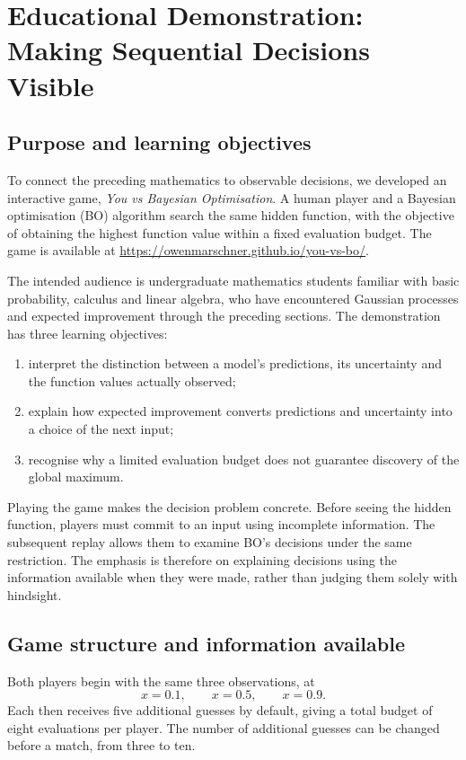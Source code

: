 \section{Educational Demonstration: Making Sequential Decisions Visible}
\label{sec:educational-demo}

\subsection{Purpose and learning objectives}

To connect the preceding mathematics to observable decisions, we developed
an interactive game, \emph{You vs Bayesian Optimisation}. A human player
and a Bayesian optimisation (BO) algorithm search the same hidden
function, with the objective of obtaining the highest function value
within a fixed evaluation budget. The game is available at
\url{https://owenmarschner.github.io/you-vs-bo/}.

The intended audience is undergraduate mathematics students familiar with
basic probability, calculus and linear algebra, who have encountered
Gaussian processes and expected improvement through the preceding
sections. The demonstration has three learning objectives:
\begin{enumerate}
    \item interpret the distinction between a model's predictions,
    its uncertainty and the function values actually observed;
    \item explain how expected improvement converts predictions and
    uncertainty into a choice of the next input;
    \item recognise why a limited evaluation budget does not guarantee
    discovery of the global maximum.
\end{enumerate}

Playing the game makes the decision problem concrete. Before seeing
the hidden function, players must commit to an input using incomplete
information. The subsequent replay allows them to examine
BO's decisions under the same restriction. The emphasis is therefore on
explaining decisions using the information available when they were made,
rather than judging them solely with hindsight.


\subsection{Game structure and information available}
\label{subsec:demo-rules}

Both players begin with the same three observations, at
\[
    x=0.1,\qquad x=0.5,\qquad x=0.9.
\]
Each then receives five additional guesses by default, giving a total
budget of eight evaluations per player. The number of additional
guesses can be changed before a match, from three to ten.

